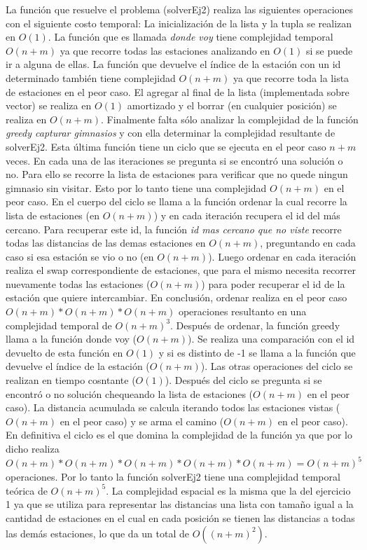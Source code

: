       La función que resuelve el problema (solverEj2) realiza las siguientes operaciones con el siguiente costo temporal: La inicialización de la lista y la tupla se realizan en $O(1)$. La función que es llamada \textit{donde voy} tiene complejidad temporal $O(n+m)$ ya que recorre todas las estaciones analizando en $O(1)$ si se puede ir a alguna de ellas. La función que devuelve el índice de la estación con un id determinado también tiene complejidad $O(n+m)$ ya que recorre toda la lista de estaciones en el peor caso. El agregar al final de la lista (implementada sobre vector) se realiza en $O(1)$ amortizado y el borrar (en cualquier posición) se realiza en $O(n+m)$. Finalmente falta sólo analizar la complejidad de la función \textit{greedy capturar gimnasios} y con ella determinar la complejidad resultante de solverEj2. 
      Esta última función tiene un ciclo que se ejecuta en el peor caso $n+m$ veces. En cada una de las iteraciones se pregunta si se encontró una solución o no. Para ello se recorre la lista de estaciones para verificar que no quede ningun gimnasio sin visitar. Esto por lo tanto tiene una complejidad $O(n+m)$ en el peor caso. En el cuerpo del ciclo se llama a la función ordenar la cual recorre la lista de estaciones (en $O(n+m)$) y en cada iteración recupera el id del más cercano. Para recuperar este id, la función \textit{id mas cercano que no viste} recorre todas las distancias de las demas estaciones en $O(n+m)$, preguntando en cada caso si esa estación se vio o no (en $O(n+m)$). Luego ordenar en cada iteración realiza el swap correspondiente de estaciones, que para el mismo necesita recorrer nuevamente todas las estaciones ($O(n+m)$) para poder recuperar el id de la estación que quiere intercambiar. En conclusión, ordenar realiza en el peor caso $O(n+m)*O(n+m)*O(n+m)$ operaciones resultanto en una complejidad temporal de $O(n+m)^3$. 
      Después de ordenar, la función greedy llama a la función donde voy ($O(n+m)$). Se realiza una comparación con el id devuelto de esta función en $O(1)$ y si es distinto de -1 se llama a la función que devuelve el índice de la estación ($O(n+m)$). Las otras operaciones del ciclo se realizan en tiempo cosntante ($O(1)$). 
      Después del ciclo se pregunta si se encontró o no solución chequeando la lista de estaciones ($O(n+m)$ en el peor caso). La distancia acumulada se calcula iterando todos las estaciones vistas ($O(n+m)$ en el peor caso) y se arma el camino ($O(n+m)$ en el peor caso). En definitiva el ciclo es el que domina la complejidad de la función ya que por lo dicho realiza $O(n+m)*O(n+m)*O(n+m)*O(n+m)*O(n+m) = O(n+m)^5$ operaciones.
      Por lo tanto la función solverEj2 tiene una complejidad temporal teórica de $O(n+m)^5$. La complejidad espacial es la misma que la del ejercicio 1 ya que se utiliza para representar las distancias una lista con tamaño igual a la cantidad de estaciones en el cual en cada posición se tienen las distancias a todas las demás estaciones, lo que da un total de $O((n+m)^2)$. 

